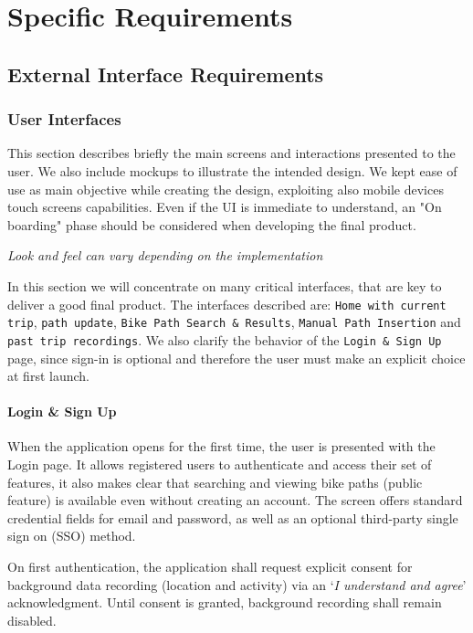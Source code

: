 \documentclass{Configuration_Files/PoliMi3i_thesis}
\begin{document}
\chapter{Specific Requirements}

\section{External Interface Requirements}
\subsection{User Interfaces}

This section describes briefly the main screens and interactions presented to the user. We also include mockups to illustrate the intended design.
We kept ease of use as main objective while creating the design, exploiting also mobile devices touch screens capabilities.
Even if the UI is immediate to understand, an "On boarding" phase should be considered when developing the final product.

\textit{Look and feel can vary depending on the implementation}

In this section we will concentrate on many critical interfaces, that are key to deliver a good final product.
The interfaces described are: \texttt{Home with current trip}, \texttt{path update}, \texttt{Bike Path Search \& Results}, \texttt{Manual Path Insertion} and \texttt{past trip recordings}. We also clarify the behavior of the \texttt{Login \& Sign Up} page, since sign-in is optional and therefore the user must make an explicit choice at first launch.

\subsubsection{Login \& Sign Up}
When the application opens for the first time, the user is presented with the Login page. It allows registered users to authenticate and access their set of features, it also makes clear that searching and viewing bike paths (public feature) is available even without creating an account. The screen offers standard credential fields for email and password, as well as an optional third-party single sign on (SSO) method.

On first authentication, the application shall request explicit consent for background data recording (location and activity) via an ‘\textit{I understand and agree}’ acknowledgment. Until consent is granted, background recording shall remain disabled.
\end{document}
